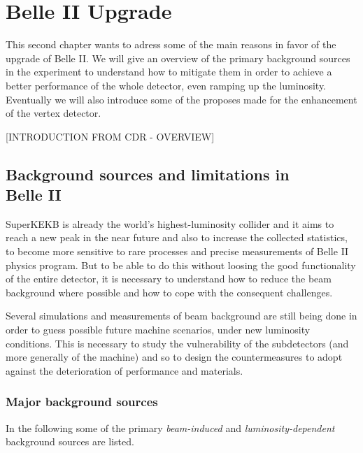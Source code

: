 \chapter{Belle II Upgrade}

This second chapter wants to adress some of the main reasons in favor of the upgrade of Belle II. We will give an overview of the primary background sources in the experiment to understand how to mitigate them in order to achieve a better performance of the whole detector, even ramping up the luminosity. Eventually we will also introduce some of the proposes made for the enhancement of the vertex detector.

[INTRODUCTION FROM CDR - OVERVIEW]


\section{Background sources and limitations in \\Belle II}

SuperKEKB is already the world's highest-luminosity collider and it aims to reach a new peak in the near future and also to increase the collected statistics, to become more sensitive to rare processes and precise measurements of Belle II physics program. 
But to be able to do this without loosing the good functionality of the entire detector, it is necessary to understand how to reduce the beam background where possible and how to cope with the consequent challenges.

Several simulations and measurements of beam background are still being done in order to guess possible future machine scenarios, under new luminosity conditions.
This is necessary to study the vulnerability of the subdetectors (and more generally of the machine) and so to design the countermeasures to adopt against the deterioration of performance and materials.


\subsection{Major background sources}

In the following some of the primary \textit{beam-induced} and \textit{luminosity-dependent} background sources are listed.


